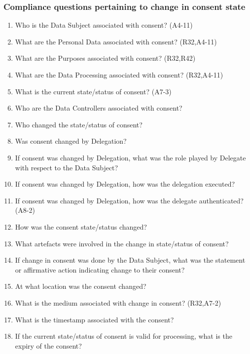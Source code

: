 \subsubsection{Compliance questions pertaining to change in consent state}
\begin{enumerate}[label={\textit{CMQ.\theenumi}},resume]
    \item Who is the Data Subject associated with consent? (A4-11)
    \item What are the Personal Data associated with consent? (R32,A4-11)
    \item What are the Purposes associated with consent? (R32,R42)
    \item What are the Data Processing associated with consent? (R32,A4-11)
    \item What is the current state/status of consent? (A7-3)
    \item Who are the Data Controllers associated with consent?
    \item Who changed the state/status of consent?
    \item Was consent changed by Delegation?
    \item If consent was changed by Delegation, what was the role played by Delegate with respect to the Data Subject?
    \item If consent was changed by Delegation, how was the delegation executed?
    \item If consent was changed by Delegation, how was the delegate authenticated? (A8-2)
    \item How was the consent state/status changed?
    \item What artefacts were involved in the change in state/status of consent?
    \item If change in consent was done by the Data Subject, what was the statement or affirmative action indicating change to their consent?
    \item At what location was the consent changed?
    \item What is the medium associated with change in consent? (R32,A7-2)
    \item What is the timestamp associated with the consent?
    \item If the current state/status of consent is valid for processing, what is the expiry of the consent?
\end{enumerate}

